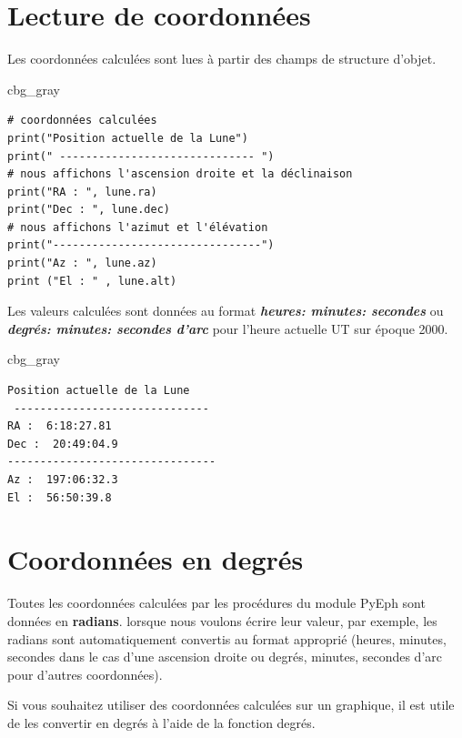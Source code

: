 \documentclass[%
oneside,                 %
final,                   %
10pt,french]{article}
\newenvironment{_cod_tight}[1]{
   \def\FrameCommand{\colorbox{#1}}
   \FrameRule0.6pt\MakeFramed {\FrameRestore}\vskip3mm}
   {\vskip0mm\endMakeFramed}
\newenvironment{cod}[1]{
\bgroup\rmfamily
\fboxsep=0mm\relax
\begin{_cod_tight}{#1}
\list{}{\parsep=-2mm\parskip=0mm\topsep=0pt\leftmargin=2mm
\rightmargin=2\leftmargin\leftmargin=4pt\relax}
\item\relax}
{\endlist\end{_cod_tight}\egroup}
\begin{document}
\section{Lecture de coordonnées}

Les coordonnées calculées sont lues à partir des champs de structure d'objet.
\begin{cod}{cbg_gray}\begin{verbatim}
# coordonnées calculées
print("Position actuelle de la Lune")
print(" ------------------------------ ")
# nous affichons l'ascension droite et la déclinaison
print("RA : ", lune.ra)
print("Dec : ", lune.dec)
# nous affichons l'azimut et l'élévation
print("--------------------------------")
print("Az : ", lune.az)
print ("El : " , lune.alt)
\end{verbatim}
\end{cod}
\noindent
Les valeurs calculées sont données au format \emph{\textbf{heures: minutes: secondes}} ou \emph{\textbf{degrés: minutes: secondes d'arc}} pour l'heure actuelle UT sur époque 2000.
\begin{cod}{cbg_gray}\begin{verbatim}
Position actuelle de la Lune
 ------------------------------
RA :  6:18:27.81
Dec :  20:49:04.9
--------------------------------
Az :  197:06:32.3
El :  56:50:39.8
\end{verbatim}
\end{cod}
\noindent
\section{Coordonnées en degrés}
Toutes les coordonnées calculées par les procédures du module PyEph sont données en \textbf{radians}. lorsque nous voulons écrire leur valeur, par exemple, les radians sont automatiquement convertis au format approprié (heures, minutes, secondes dans le cas d'une ascension droite ou degrés, minutes, secondes d'arc pour d'autres coordonnées).

Si vous souhaitez utiliser des coordonnées calculées sur un graphique, il est utile de les convertir en degrés à l'aide de la fonction degrés.
\end{document}
